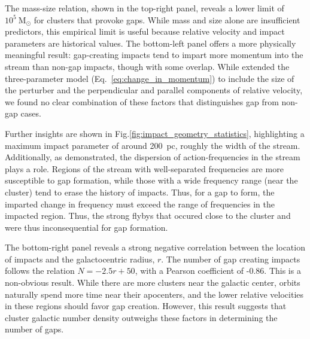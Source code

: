 \documentclass[draft]{aa}
\begin{document}
    The mass-size relation, shown in the top-right panel, reveals a lower limit of $10^5~\textrm{M}_{\odot}$ for clusters that provoke gaps. While mass and size alone are insufficient predictors, this empirical limit is useful because relative velocity and impact parameters are historical values. The bottom-left panel offers a more physically meaningful result: gap-creating impacts tend to impart more momentum into the stream than non-gap impacts, though with some overlap. While \citet{2015MNRAS.450.1136E} extended the three-parameter model (Eq.~\ref{eq:change_in_momentum}) to include the size of the perturber and the perpendicular and parallel components of relative velocity, we found no clear combination of these factors that distinguishes gap from non-gap cases.
    
    Further insights are shown in Fig.\ref{fig:impact_geometry_statistics}, highlighting a maximum impact parameter of around 200~pc, roughly the width of the stream. Additionally, as \citet{2016MNRAS.457.3817S} demonstrated, the dispersion of action-frequencies in the stream plays a role. Regions of the stream with well-separated frequencies are more susceptible to gap formation, while those with a wide frequency range (near the cluster) tend to erase the history of impacts. Thus, for a gap to form, the imparted change in frequency must exceed the range of frequencies in the impacted region. Thus, the strong flybys that occured close to the cluster and were thus inconsequential for gap formation.


    The bottom-right panel reveals a strong negative correlation between the location of impacts and the galactocentric radius, $r$. The number of gap creating impacts follows the relation $N = -2.5r + 50$, with a Pearson coefficient of -0.86. This is a non-obvious result. While there are more clusters near the galactic center, orbits naturally spend more time near their apocenters, and the lower relative velocities in these regions should favor gap creation. However, this result suggests that cluster galactic number density outweighs these factors in determining the number of gaps.
\end{document}
